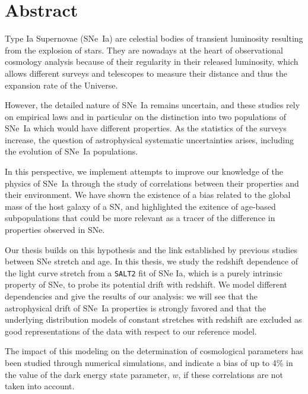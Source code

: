 \documentclass[../main/main.tex]{subfiles}
\begin{document}
\chapter*{Abstract}\label{ch}
\shorthandoff{:}

Type Ia Supernovae (SNe~Ia) are celestial bodies of transient luminosity
resulting from the explosion of stars. They are nowadays at the heart of
observational cosmology analysis because of their regularity in their released
luminosity, which allows different surveys and telescopes to measure their
distance and thus the expansion rate of the Universe.

However, the detailed nature of SNe~Ia remains uncertain, and these studies rely
on empirical laws and in particular on the distinction into two populations of
SNe~Ia which would have different properties. As the statistics of the surveys
increase, the question of astrophysical systematic uncertainties arises,
including the evolution of SNe~Ia populations.

In this perspective, we implement attempts to improve our knowledge of the
physics of SNe~Ia through the study of correlations between their properties and
their environment. We have shown the existence of a bias related to the global
mass of the host galaxy of a SN, and highlighted the exitence of age-based
subpopulations that could be more relevant as a tracer of the difference in
properties observed in SNe.

Our thesis builds on this hypothesis and the link established by previous
studies between SNe stretch and age. In this thesis, we study the redshift
dependence of the light curve stretch from a \texttt{SALT2} fit of SNe Ia, which
is a purely intrinsic property of SNe, to probe its potential drift with
redshift. We model different dependencies and give the results of our analysis:
we will see that the astrophysical drift of SNe~Ia properties is strongly
favored and that the underlying distribution models of constant stretches with
redshift are excluded as good representations of the data with respect to our
reference model.

The impact of this modeling on the determination of cosmological parameters has
been studied through numerical simulations, and indicate a bias of up to 4\% in
the value of the dark energy state parameter, $w$, if these correlations are not
taken into account.

\shorthandon{:}
\end{document}
